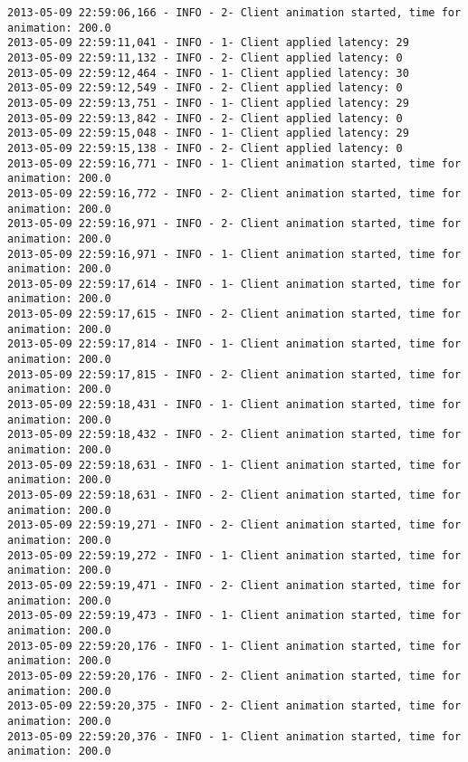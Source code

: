 \begin{verbatim}
2013-05-09 22:59:06,166 - INFO - 2- Client animation started, time for animation: 200.0
2013-05-09 22:59:11,041 - INFO - 1- Client applied latency: 29
2013-05-09 22:59:11,132 - INFO - 2- Client applied latency: 0
2013-05-09 22:59:12,464 - INFO - 1- Client applied latency: 30
2013-05-09 22:59:12,549 - INFO - 2- Client applied latency: 0
2013-05-09 22:59:13,751 - INFO - 1- Client applied latency: 29
2013-05-09 22:59:13,842 - INFO - 2- Client applied latency: 0
2013-05-09 22:59:15,048 - INFO - 1- Client applied latency: 29
2013-05-09 22:59:15,138 - INFO - 2- Client applied latency: 0
2013-05-09 22:59:16,771 - INFO - 1- Client animation started, time for animation: 200.0
2013-05-09 22:59:16,772 - INFO - 2- Client animation started, time for animation: 200.0
2013-05-09 22:59:16,971 - INFO - 2- Client animation started, time for animation: 200.0
2013-05-09 22:59:16,971 - INFO - 1- Client animation started, time for animation: 200.0
2013-05-09 22:59:17,614 - INFO - 1- Client animation started, time for animation: 200.0
2013-05-09 22:59:17,615 - INFO - 2- Client animation started, time for animation: 200.0
2013-05-09 22:59:17,814 - INFO - 1- Client animation started, time for animation: 200.0
2013-05-09 22:59:17,815 - INFO - 2- Client animation started, time for animation: 200.0
2013-05-09 22:59:18,431 - INFO - 1- Client animation started, time for animation: 200.0
2013-05-09 22:59:18,432 - INFO - 2- Client animation started, time for animation: 200.0
2013-05-09 22:59:18,631 - INFO - 1- Client animation started, time for animation: 200.0
2013-05-09 22:59:18,631 - INFO - 2- Client animation started, time for animation: 200.0
2013-05-09 22:59:19,271 - INFO - 2- Client animation started, time for animation: 200.0
2013-05-09 22:59:19,272 - INFO - 1- Client animation started, time for animation: 200.0
2013-05-09 22:59:19,471 - INFO - 2- Client animation started, time for animation: 200.0
2013-05-09 22:59:19,473 - INFO - 1- Client animation started, time for animation: 200.0
2013-05-09 22:59:20,176 - INFO - 1- Client animation started, time for animation: 200.0
2013-05-09 22:59:20,176 - INFO - 2- Client animation started, time for animation: 200.0
2013-05-09 22:59:20,375 - INFO - 2- Client animation started, time for animation: 200.0
2013-05-09 22:59:20,376 - INFO - 1- Client animation started, time for animation: 200.0
\end{verbatim}

